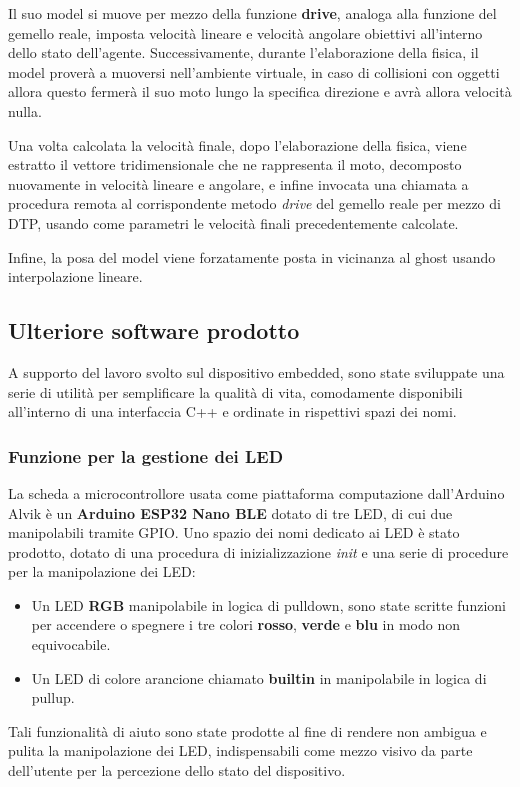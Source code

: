 Il suo model si muove per mezzo della funzione \textbf{drive}, analoga alla funzione del gemello reale, imposta velocità lineare e velocità angolare obiettivi all'interno dello stato dell'agente. Successivamente, durante l'elaborazione della fisica, il model proverà a muoversi nell'ambiente virtuale, in caso di collisioni con oggetti allora questo fermerà il suo moto lungo la specifica direzione e avrà allora velocità nulla.

Una volta calcolata la velocità finale, dopo l'elaborazione della fisica, viene estratto il vettore tridimensionale che ne rappresenta il moto, decomposto nuovamente in velocità lineare e angolare, e infine invocata una chiamata a procedura remota al corrispondente metodo \textit{drive} del gemello reale per mezzo di DTP, usando come parametri le velocità finali precedentemente calcolate.

Infine, la posa del model viene forzatamente posta in vicinanza al ghost usando interpolazione lineare.

\subsection*{Ulteriore software prodotto}
A supporto del lavoro svolto sul dispositivo embedded, sono state sviluppate una serie di utilità per semplificare la qualità di vita, comodamente disponibili all'interno di una interfaccia C++ e ordinate in rispettivi spazi dei nomi.
\subsubsection*{Funzione per la gestione dei LED}
La scheda a microcontrollore usata come piattaforma computazione dall'Arduino Alvik è un \textbf{Arduino ESP32 Nano BLE} dotato di tre LED, di cui due manipolabili tramite GPIO. Uno spazio dei nomi dedicato ai LED è stato prodotto, dotato di una procedura di inizializzazione \textit{init} e una serie di procedure per la manipolazione dei LED:
\begin{itemize}
	\item Un LED \textbf{RGB} manipolabile in logica di pulldown, sono state scritte funzioni per accendere o spegnere i tre colori \textbf{rosso}, \textbf{verde} e \textbf{blu} in modo non equivocabile.
	\item Un LED di colore arancione chiamato \textbf{builtin} in manipolabile in logica di pullup.
\end{itemize}
Tali funzionalità di aiuto sono state prodotte al fine di rendere non ambigua e pulita la manipolazione dei LED, indispensabili come mezzo visivo da parte dell'utente per la percezione dello stato del dispositivo.
